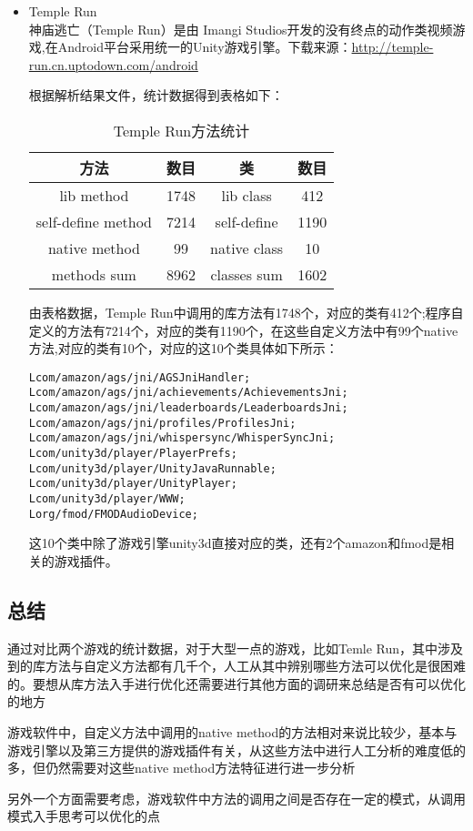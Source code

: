 \begin{itemize}
\item Temple Run\\
神庙逃亡（Temple Run）是由 Imangi Studios开发的没有终点的动作类视频游戏,在Android平台采用统一的Unity游戏引擎。下载来源：\url{http://temple-run.cn.uptodown.com/android}

根据解析结果文件，统计数据得到表格如下：
\begin{table}[htbp]
\centering
\caption{\label{Temple Run}Temple Run方法统计}
\begin{tabular}{|c|c|c|c|}
\hline
方法 & 数目 & 类 & 数目\\
\hline
lib method & 1748 & lib class & 412\\
\hline
self-define method & 7214 & self-define & 1190\\
\hline
native method & 99 & native class & 10\\
\hline
methods sum & 8962 & classes sum & 1602\\
\hline
\end{tabular}
\end{table}
由表格数据，Temple Run中调用的库方法有1748个，对应的类有412个;程序自定义的方法有7214个，对应的类有1190个，在这些自定义方法中有99个native方法,对应的类有10个，对应的这10个类具体如下所示：
\begin{lstlisting}
Lcom/amazon/ags/jni/AGSJniHandler;
Lcom/amazon/ags/jni/achievements/AchievementsJni;
Lcom/amazon/ags/jni/leaderboards/LeaderboardsJni;
Lcom/amazon/ags/jni/profiles/ProfilesJni;
Lcom/amazon/ags/jni/whispersync/WhisperSyncJni;
Lcom/unity3d/player/PlayerPrefs;
Lcom/unity3d/player/UnityJavaRunnable;
Lcom/unity3d/player/UnityPlayer;
Lcom/unity3d/player/WWW;
Lorg/fmod/FMODAudioDevice;
\end{lstlisting}
这10个类中除了游戏引擎unity3d直接对应的类，还有2个amazon和fmod是相关的游戏插件。
\end{itemize}

\subsection{总结}
通过对比两个游戏的统计数据，对于大型一点的游戏，比如Temle Run，其中涉及到的库方法与自定义方法都有几千个，人工从其中辨别哪些方法可以优化是很困难的。要想从库方法入手进行优化还需要进行其他方面的调研来总结是否有可以优化的地方

游戏软件中，自定义方法中调用的native method的方法相对来说比较少，基本与游戏引擎以及第三方提供的游戏插件有关，从这些方法中进行人工分析的难度低的多，但仍然需要对这些native method方法特征进行进一步分析

另外一个方面需要考虑，游戏软件中方法的调用之间是否存在一定的模式，从调用模式入手思考可以优化的点


